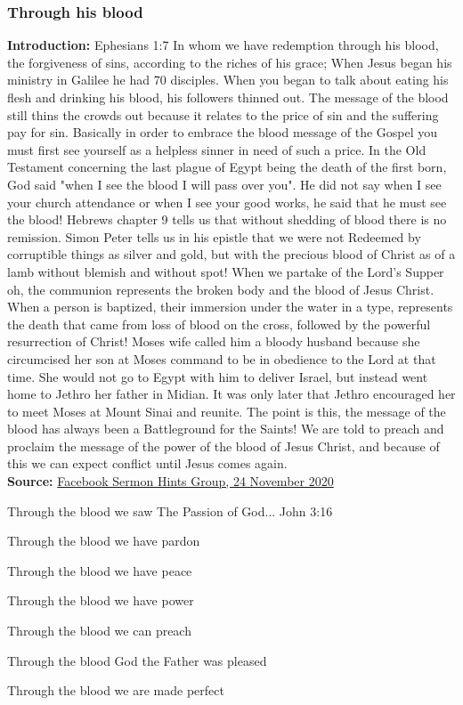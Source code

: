 \subsubsection{Through his blood}
\textbf{Introduction:} Ephesians 1:7  In whom we have redemption through his blood, the forgiveness of sins, according to the riches of his grace;
When Jesus began his ministry in Galilee he had 70 disciples. When you began to talk about eating his flesh and drinking his blood, his followers thinned out. The message of the blood still thins the crowds out because it relates to the price of sin and the suffering pay for sin. Basically in order to embrace the blood message of the Gospel you must first see yourself as a helpless sinner in need of such a price.
In the Old Testament concerning the last plague of Egypt being the death of the first born, God said "when I see the blood I will pass over you". He did not say when I see your church attendance or when I see your good works, he said that he must see the blood!
Hebrews chapter 9 tells us that without shedding of blood there is no remission. Simon Peter tells us in his epistle that we were not Redeemed by corruptible things as silver and gold, but with the precious blood of Christ as of a lamb without blemish and without spot!
When we partake of the Lord's Supper oh, the communion represents the broken body and the blood of Jesus Christ. When a person is baptized, their immersion under the water in a type, represents the death that came from loss of blood on the cross, followed by the powerful resurrection of Christ!
Moses wife called him a bloody husband because she circumcised her son at Moses command to be in obedience to the Lord at that time. She would not go to Egypt with him to deliver Israel, but instead went home to Jethro her father in Midian. It was only later that Jethro encouraged her to meet Moses at Mount Sinai and reunite.
The point is this, the message of the blood has always been a Battleground for the Saints! We are told to preach and proclaim the message of the power of the blood of Jesus Christ, and because of this we can expect conflict until Jesus comes again.\\
\noindent \textbf{Source:} \href{https://www.facebook.com/groups/sermonhints/posts/2856486564593139}{Facebook Sermon Hints Group, 24 November 2020}
\begin{compactenum}[I.]
    \item Through the blood we saw The Passion of God... John 3:16
    \item Through the blood we have pardon
    \item Through the blood we have peace
    \item Through the blood we have power
    \item Through the blood we can preach
    \item Through the blood God the Father was pleased
    \item Through the blood we are made perfect
\end{compactenum}

